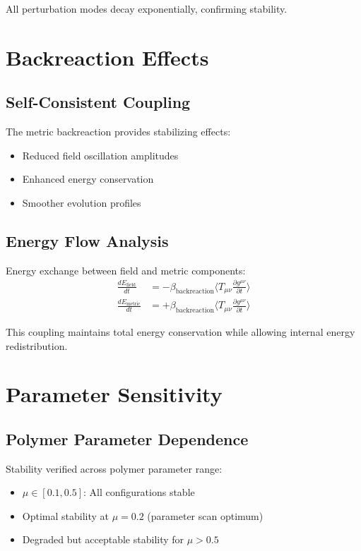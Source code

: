 \documentclass[11pt,a4paper]{article}
\begin{document}
All perturbation modes decay exponentially, confirming stability.

\section{Backreaction Effects}

\subsection{Self-Consistent Coupling}

The metric backreaction provides stabilizing effects:
\begin{itemize}
\item Reduced field oscillation amplitudes
\item Enhanced energy conservation
\item Smoother evolution profiles
\end{itemize}

\subsection{Energy Flow Analysis}

Energy exchange between field and metric components:
\begin{align}
\frac{dE_{\text{field}}}{dt} &= -\beta_{\text{backreaction}} \langle T_{\mu\nu} \frac{\partial g^{\mu\nu}}{\partial t} \rangle \\
\frac{dE_{\text{metric}}}{dt} &= +\beta_{\text{backreaction}} \langle T_{\mu\nu} \frac{\partial g^{\mu\nu}}{\partial t} \rangle
\end{align}

This coupling maintains total energy conservation while allowing internal energy redistribution.

\section{Parameter Sensitivity}

\subsection{Polymer Parameter Dependence}

Stability verified across polymer parameter range:
\begin{itemize}
\item $\mu \in [0.1, 0.5]$: All configurations stable
\item Optimal stability at $\mu = 0.2$ (parameter scan optimum)
\item Degraded but acceptable stability for $\mu > 0.5$
\end{itemize}
\end{document}
